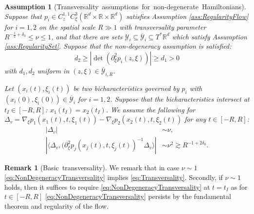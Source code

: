 \documentclass{amsart}
\newtheorem{assumption}[theorem]{Assumption}
\theoremstyle{definition}
\newtheorem{remark}[theorem]{Remark}
\newcommand{\R}{\mathbb{R}}
\begin{document}
\begin{assumption}[Transversality~assumptions~for~non-degenerate~Hamiltonians]
\label{AssumptionNondegenerateHamiltonian}
Suppose that $p_i \in C_{z}^{1,1} C_{\xi}^3(\R^d \times \R \times \R^d)$ satisfies Assumption \ref{ass:RegularityFlow} for $i=1,2$ on the spatial scale $R \gg 1$ with transversality parameter $R^{-\frac{1}{2}+\delta_0} \leq \nu \leq 1$, and that there are sets $\mathcal{Y}_i \subseteq \overline{\mathcal{Y}}_i \subseteq T^* \R^d$ which satisfy Assumption \ref{ass:RegularitySet}. Suppose that the non-degeneracy assumption is satisfied:
\begin{equation}
\label{eq:NonDegeneracyAssumption}
d_2 \geq |\det(\partial_{\xi}^2 p_i(z,\xi))| \geq d_1 > 0
\end{equation}
with $d_1,d_2$ uniform in $(z,\xi) \in \overline{\mathcal{Y}}_{i,R}$.

Let $(x_i(t),\xi_i(t))$ be two bicharacteristics governed by $p_i$ with $(x_i(0),\xi_i(0)) \in \overline{\mathcal{Y}}_i$ for $i=1,2$. Suppose that the bicharacteristics intersect at $t_I \in [-R,R]$: $x_1(t_I) = x_2(t_I)$.
We assume the following for $\Delta_v = \nabla_{\xi} p_1(x_1(t),t,\xi_1(t)) - \nabla_{\xi} p_2(x_2(t),t,\xi_2(t))$ for any $t \in [-R,R]$:
\begin{align}
\label{eq:Transversality}
| \Delta_v | &\sim \nu, \\
\label{eq:NonDegeneracyTransversality}
| \langle \Delta_v, (\partial^2_{\xi} p_j(x_j(t),t,\xi_j(t))^{-1}  \Delta_v \rangle | &\sim \nu^2 \gtrsim R^{-1+2\delta_0}.
\end{align}

\end{assumption}

\begin{remark}[Basic~transversality]
We remark that in case $\nu \sim 1$ \eqref{eq:NonDegeneracyTransversality} implies \eqref{eq:Transversality}. Secondly, if $\nu \sim 1$ holds, then it suffices to require \eqref{eq:NonDegeneracyTransversality} at $t=t_I$ as for $t \in [-R,R]$ \eqref{eq:NonDegeneracyTransversality} persists by the fundamental theorem and regularity of the flow.
\end{remark}
\end{document}

